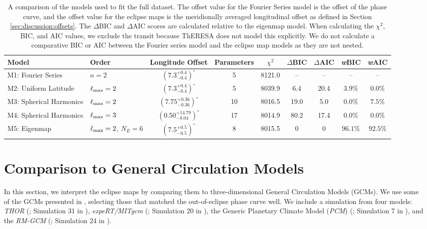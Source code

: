 \documentclass[twocolumn]{aastex631}
\begin{document}
\begin{table}
\centering
\begin{tabular}{ll|ccccccc}
\textbf{Model}   & \textbf{Order} & Longitude Offset & Parameters & $\chi^{2}$ & $\Delta$BIC & $\Delta$AIC & \textit{w}BIC & \textit{w}AIC \\
\hline
M1: Fourier Series & $n=2$   & $(7.3^{+0.4}_{-0.4})^{\circ}$    & 5  & 8121.0  & --  & -- & -- & -- \\
M2: Uniform Latitude &  $\ell_{\rm max}=2$ &  $(7.3^{+0.4}_{-0.4})^{\circ}$   & 5 & 8039.9 & 6.4  & 20.4 & $3.9\%$ & $0.0\%$  \\
M3: Spherical Harmonics &  $\ell_{\rm max}=2$ &  $(7.75^{+0.36}_{-0.36})^{\circ}$   & 10 & 8016.5 &  19.0 & 5.0 & $0.0\%$ & $7.5\%$  \\
M4: Spherical Harmonics & $\ell_{\rm max}=3$ &  $(0.50^{+14.79}_{-8.04})^{\circ}$  & 17 & 8014.9 & 80.2 & 17.4 & $0.0\%$ & $0.0\%$  \\
M5: Eigenmap & $\ell_{\rm max}=2$, $N_{E}=6$       &  $(7.5^{+0.5}_{-0.5})^{\circ}$  & 8 & 8015.5  & 0 & 0 & $96.1\%$ & $92.5\%$   \\ 
\end{tabular}
\caption{A comparison of the models used to fit the full dataset. The offset value for the Fourier Series model is the offset of the phase curve, and the offset value for the eclipse maps is the meridionally averaged longitudinal offset as defined in Section \ref{sec:discussion:offsets}. The $\Delta$BIC and $\Delta$AIC scores are calculated relative to the eigenmap model. When calculating the $\chi^{2}$, BIC, and AIC values, we exclude the transit because ThERESA \citep{challener2022theresa} does not model this explicitly.  We do not calculate a comparative BIC or AIC between the Fourier series model and the eclipse map models as they are not nested.}\label{tab:model_comparison}
\end{table}

\section{Comparison to General Circulation Models}\label{sec:discussion}

In this section, we interpret the eclipse maps by comparing them to three-dimensional General Circulation Models (GCMs). We use some of the GCMs presented in \citet{bell2023wasp43b}, selecting those that matched the out-of-eclipse phase curve well. We include a simulation from four models: \emph{THOR} (\citealp{mendoncca2016thor,mendoncca2018revisiting,mendoncca2018three}; Simulation 31 in \citealp{bell2023wasp43b}), \emph{expeRT/MITgcm} (\citealp{carone2020equatorial,schneider2022exploring}; Simulation 20 in \citealp{bell2023wasp43b}), the Generic Planetary Climate Model (\emph{PCM}) (\citealp{teinturier2023}; Simulation 7 in \citealp{bell2023wasp43b}), and the \emph{RM-GCM} (\citealp{rauscher2012general,roman2017modeling,roman2021clouds}; Simulation 24 in \citealp{bell2023wasp43b}). 
\end{document}
